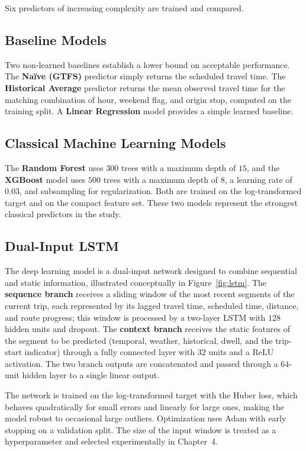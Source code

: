 Six predictors of increasing complexity are trained and compared.

\subsection{Baseline Models}

Two non-learned baselines establish a lower bound on acceptable performance. The \textbf{Naïve (GTFS)} predictor simply returns the scheduled travel time. The \textbf{Historical Average} predictor returns the mean observed travel time for the matching combination of hour, weekend flag, and origin stop, computed on the training split. A \textbf{Linear Regression} model provides a simple learned baseline.

\subsection{Classical Machine Learning Models}

The \textbf{Random Forest} uses $300$ trees with a maximum depth of $15$, and the \textbf{XGBoost} model uses $500$ trees with a maximum depth of $8$, a learning rate of $0.03$, and subsampling for regularization. Both are trained on the log-transformed target and on the compact feature set. These two models represent the strongest classical predictors in the study.

\subsection{Dual-Input LSTM}

The deep learning model is a dual-input network designed to combine sequential and static information, illustrated conceptually in Figure~\ref{fig:lstm}. The \textbf{sequence branch} receives a sliding window of the most recent segments of the current trip, each represented by its lagged travel time, scheduled time, distance, and route progress; this window is processed by a two-layer LSTM with $128$ hidden units and dropout. The \textbf{context branch} receives the static features of the segment to be predicted (temporal, weather, historical, dwell, and the trip-start indicator) through a fully connected layer with $32$ units and a ReLU activation. The two branch outputs are concatenated and passed through a $64$-unit hidden layer to a single linear output.

The network is trained on the log-transformed target with the Huber loss, which behaves quadratically for small errors and linearly for large ones, making the model robust to occasional large outliers. Optimization uses Adam with early stopping on a validation split. The size of the input window is treated as a hyperparameter and selected experimentally in Chapter~4.

